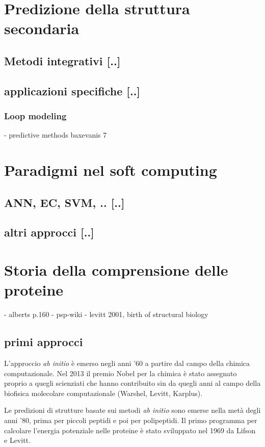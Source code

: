 \section{Predizione della struttura secondaria}


\subsection{Metodi integrativi [..]}
\subsection{applicazioni specifiche [..]}
\subsubsection{Loop modeling}

- predictive methods
baxevanis 7

\section{Paradigmi nel soft computing}
\subsection{ANN, EC, SVM, .. [..]}
\subsection{altri approcci [..]}

\section{Storia della comprensione delle proteine}
- alberts p.160
- psp-wiki
- levitt 2001, birth of structural biology

\subsection{primi approcci}

L'approccio \textit{ab initio} è emerso negli anni '60 a partire dal campo della chimica computazionale. Nel 2013 il premio Nobel per la chimica è stato assegnato proprio a quegli scienziati che hanno contribuito sin da quegli anni al campo della biofisica molecolare computazionale (Warshel, Levitt, Karplus).

\par Le predizioni di strutture basate sui metodi \textit{ab initio} sono emerse nella metà degli anni '80, prima per piccoli peptidi e poi per polipeptidi. Il primo programma per calcolare l'energia potenziale nelle proteine è stato sviluppato nel 1969 da Lifson e Levitt\supercite{levitt1969refinement}.

